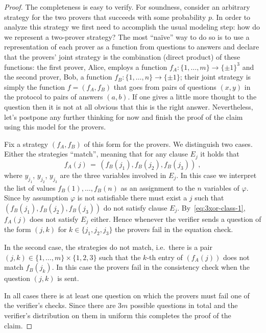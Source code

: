 \begin{proof}
The completeness is easy to verify. For soundness, consider an arbitrary strategy for the two provers that succeeds with some probability $p$. In order to analyze this strategy we first need to accomplish the usual modeling step: how do we represent a two-prover strategy? The most ``na\"ive'' way to do so is to use a representation of each prover as a function from questions to answers and declare that the provers' joint strategy is the combination (direct product) of these functions: the first prover, Alice, employs a function $f_A: \{1,\ldots,m\} \to \{\pm 1\}^3$ and the second prover, Bob, a function $f_B:\{1,\ldots,n\}\to\{\pm 1\}$; their joint strategy is simply the function $f=(f_A,f_B)$ that goes from pairs of questions $(x,y)$ in the protocol to pairs of answers $(a,b)$. 
If one gives a little more thought to the question then it is not at all obvious that this is the right answer. Nevertheless, let's postpone any further thinking for now and finish the proof of the claim using this model for the provers. 

Fix a strategy $(f_A,f_B)$ of this form for the provers. We distinguish two cases. Either the strategies ``match'', meaning that for any clause $E_j$ it holds that 
\begin{equation}\label{eq:3xor-class-1}
f_A(j)\,=\,(f_B(j_1),f_B(j_2),f_B(j_3))\;,
\end{equation}
 where $y_{j_1}$, $y_{j_2}$, $y_{j_3}$ are the three variables involved in $E_j$. In this case we interpret the list of values $f_B(1),\ldots,f_B(n)$ as an assignment to the $n$ variables of $\varphi$. Since by assumption $\varphi$ is not satisfiable there must exist a $j$ such that $(f_B(j_1),f_B(j_2),f_B(j_3))$ do not satisfy clause $E_j$. By~\eqref{eq:3xor-class-1}, $f_A(j)$ does not satisfy $E_j$ either. Hence whenever the verifier sends a question of the form $(j,k)$ for $k\in \{j_1,j_2,j_3\}$ the provers fail in the equation check. 

In the second case, the strategies do not match, i.e.\ there is a pair $(j,k)\in \{1,\ldots,m\}\times\{1,2,3\}$ such that the $k$-th entry of $(f_A(j))$ does not match $f_B(j_k)$. In this case the provers fail in the consistency check when the question $(j,k)$ is sent. 

In all cases there is at least one question on which the provers must fail one of the verifier's checks. Since there are $3m$ possible questions  in total and the verifier's distribution on them in uniform this completes the proof of the claim. 
\end{proof}

